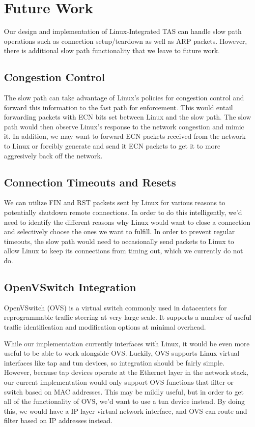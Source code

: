 \section{Future Work}\label{Future}

Our design and implementation of Linux-Integrated TAS can handle slow path
operations such as connection setup/teardown as well as ARP packets. However,
there is additional slow path functionality that we leave to future work.

\subsection{Congestion Control}
The slow path can take advantage of Linux's policies for congestion control
and forward this information to the fast path for enforcement. This would entail
forwarding packets with ECN bits set between Linux and the slow path. The slow
path would then observe Linux's response to the network congestion and mimic
it. In addition, we may want to forward ECN packets received from the network to
Linux or forcibly generate and send it ECN packets to get it to more aggresively
back off the network. 

\subsection{Connection Timeouts and Resets}

We can utilize FIN and RST packets sent by Linux for various reasons to 
potentially shutdown remote connections. In order to do this intelligently, we'd
need to identify the different reasons why Linux would want to close a 
connection and selectively choose the ones we want to fulfill. In order to 
prevent regular timeouts, the slow path would need to occasionally send packets 
to Linux to allow Linux to keep its connections from timing out, which we 
currently do not do. 

\subsection{OpenVSwitch Integration}

OpenVSwitch\cite{pfaff:openvswitch_nsdi} (OVS) is a virtual switch commonly used
in datacenters for reprogrammable traffic steering at very large scale. It 
supports a number of useful traffic identification and modification options at 
minimal overhead. 

While our implementation currently interfaces with Linux, it would be even more
useful to be able to work alongside OVS. Luckily, OVS supports Linux virtual 
interfaces like tap and tun devices, so integration should be fairly simple. 
However, because tap devices operate at the Ethernet layer in the network stack,
our current implementation would only support OVS functions that filter or 
switch based on MAC addresses. This may be mildly useful, but in order to get 
all of the functionality of OVS, we'd want to use a tun device instead. By doing
this, we would have a IP layer virtual network interface, and OVS can route and 
filter based on IP addresses instead.
